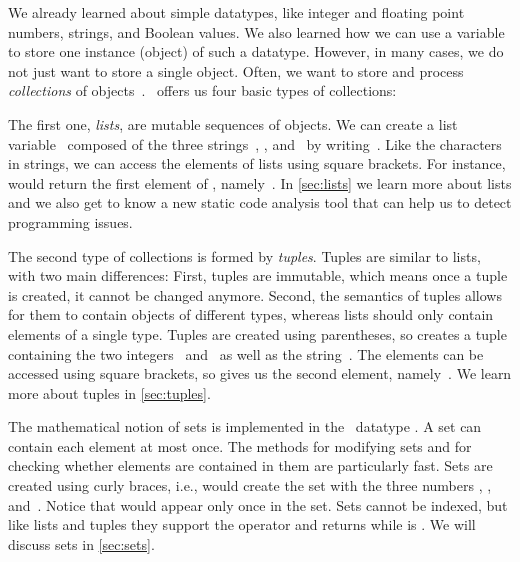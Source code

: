 %
\label{sec:collections}%
%
We already learned about simple datatypes, like integer and floating point numbers, strings, and Boolean values.
We also learned how we can use a variable to store one instance (object) of such a datatype.
However, in many cases, we do not just want to store a single object.
Often, we want to store and process \emph{collections} of objects~\cite{PSF:P3D:TPSL:BIT,PSF:P3D:TPLR:DM,PSF:P3D:TPSL:CAABCFC}.
\python\ offers us four basic types of collections:

The first one, \emph{lists}, are mutable sequences of objects.
We can create a list variable~ composed of the three strings~, , and~ by writing~.
Like the characters in strings, we can access the elements of lists using square brackets.
For instance,  would return the first element of , namely~.
In \cref{sec:lists} we learn more about lists and we also get to know a new static code analysis tool that can help us to detect programming issues.

The second type of collections is formed by \emph{tuples}.
Tuples are similar to lists, with two main differences:
First, tuples are immutable, which means once a tuple is created, it cannot be changed anymore.
Second, the semantics of tuples allows for them to contain objects of different types, whereas lists should only contain elements of a single type.
Tuples are created using parentheses, so  creates a tuple  containing the two integers~ and~ as well as the string~.
The elements can be accessed using square brackets, so  gives us the second element, namely~.
We learn more about tuples in \cref{sec:tuples}.

The mathematical notion of sets is implemented in the \python\ datatype .
A set can contain each element at most once.
The methods for modifying sets and for checking whether elements are contained in them are particularly fast.
Sets are created using curly braces, i.e.,  would create the set  with the three numbers , , and~.
Notice that  would appear only once in the set.
Sets cannot be indexed, but like lists and tuples they support the  operator and  returns  while  is .
We will discuss sets in \cref{sec:sets}.


